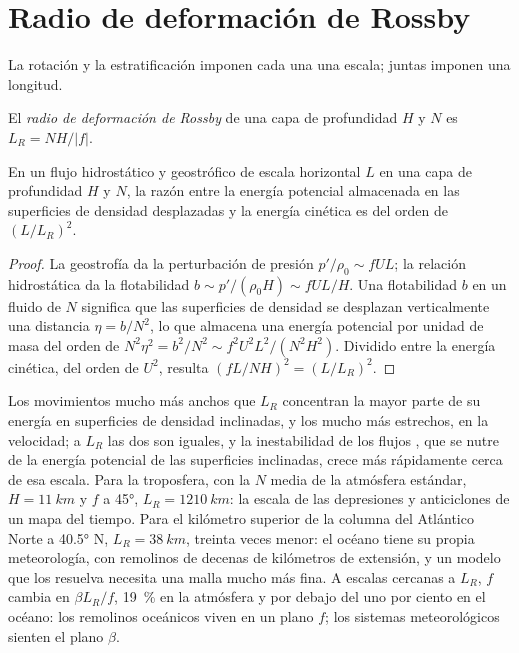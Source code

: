 \section{Radio de deformación de Rossby}\label{sec:b3:gfd-foundations:rossby-radius}

La rotación y la estratificación imponen cada una una escala; juntas imponen
una longitud.

\begin{definition}\label{def:b3:gfd-foundations:rossby-radius}
El \emph{radio de deformación de Rossby}
de una capa de profundidad $H$ y  $N$ es $L_R = NH/|f|$.
\end{definition}

\begin{proposition}\label{prop:b3:gfd-foundations:rossby-radius}
En un flujo hidrostático y geostrófico de escala horizontal $L$ en una capa de
profundidad $H$ y  $N$, la razón entre la energía potencial
almacenada en las superficies de densidad desplazadas y la energía cinética es del orden de
$(L/L_R)^2$.
\end{proposition}

\begin{proof}
La geostrofía da la perturbación de presión $p'/\rho_0 \sim fUL$; la
relación hidrostática da la flotabilidad $b \sim p'/(\rho_0H) \sim fUL/H$. Una
flotabilidad $b$ en un fluido de  $N$ significa que las superficies de densidad
se desplazan verticalmente una distancia $\eta = b/N^2$, lo que almacena una energía potencial por
unidad de masa del orden de $N^2\eta^2 = b^2/N^2 \sim f^2U^2L^2/(N^2H^2)$. Dividido
entre la energía cinética, del orden de $U^2$, resulta $(fL/NH)^2 = (L/L_R)^2$.
\end{proof}

Los movimientos mucho más anchos que $L_R$ concentran la mayor parte de su energía en
superficies de densidad inclinadas, y los mucho más estrechos, en la velocidad; a $L_R$ las dos
son iguales, y la inestabilidad de los flujos , que se nutre de la
energía potencial de las superficies inclinadas, crece más rápidamente cerca de esa escala. Para
la troposfera, con la $N$ media de la atmósfera estándar, $H =
\qty{11}{km}$ y $f$ a \ang{45}, $L_R = \qty{1210}{km}$: la escala de las
depresiones y anticiclones de un mapa del tiempo. Para el kilómetro superior de
la columna del Atlántico Norte a \ang{40.5} N, $L_R = \qty{38}{km}$, treinta
veces menor: el océano tiene su propia meteorología, con remolinos de decenas de
kilómetros de extensión, y un modelo que los resuelva necesita una malla mucho más fina. A escalas
cercanas a $L_R$, $f$ cambia en $\beta L_R/f$, \qty{19}{\percent} en la
atmósfera y por debajo del uno por ciento en el océano: los remolinos oceánicos viven en un
plano $f$; los sistemas meteorológicos sienten el plano $\beta$.


